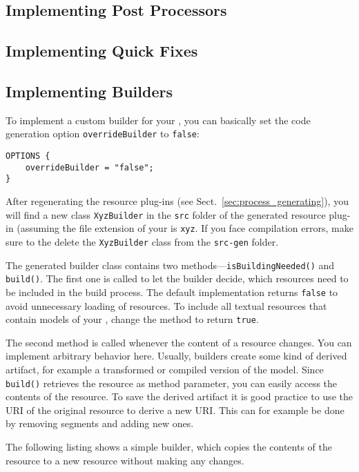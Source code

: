 \subsection{Implementing Post Processors}

\subsection{Implementing Quick Fixes}

\subsection{Implementing Builders}
\label{sec:cust_builders}

To implement a custom builder for your \DSL, you can basically set the code
generation option \texttt{overrideBuilder} to \texttt{false}:

\begin{lstlisting}
OPTIONS {
    overrideBuilder = "false";
}
\end{lstlisting}

After regenerating the resource plug-ins (see
Sect.~\ref{sec:process_generating}), you will find a new class
\texttt{XyzBuilder} in the \texttt{src} folder of the generated resource 
plug-in (assuming the file extension of your \DSL is \texttt{xyz}. If you
face compilation errors, make sure to the delete the \texttt{XyzBuilder} 
class from the \texttt{src-gen} folder.

The generated builder class contains two methods---\texttt{isBuildingNeeded()} and
\texttt{build()}. The first one is called to let the builder decide, which
resources need to be included in the build process. The default implementation
returns \texttt{false} to avoid unnecessary loading of resources. To include all
textual resources that contain models of your \DSL, change the method to return
\texttt{true}.

The second method is called whenever the content of a resource changes. You can
implement arbitrary behavior here. Usually, builders create some kind of derived
artifact, for example a transformed or compiled version of the \DSL model. Since
\texttt{build()} retrieves the resource as method parameter, you can easily
access the contents of the resource. To save the derived artifact it is good
practice to use the URI of the original resource to derive a new URI. This can
for example be done by removing segments and adding new ones.

The following listing shows a simple builder, which copies the contents of the
resource to a new resource without making any changes.

